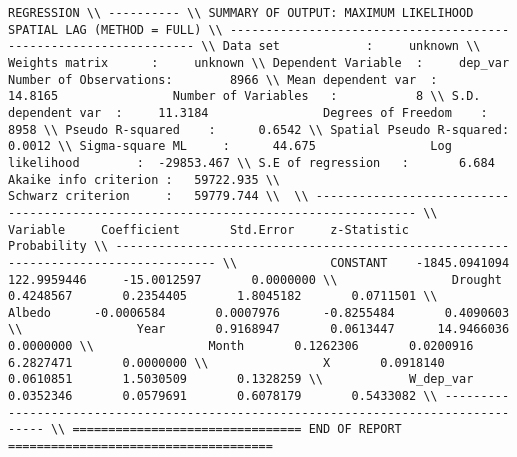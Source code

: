 \documentclass{article}
\begin{document}
 
\begin{verbatim} 
REGRESSION \\ ---------- \\ SUMMARY OF OUTPUT: MAXIMUM LIKELIHOOD SPATIAL LAG (METHOD = FULL) \\ ----------------------------------------------------------------- \\ Data set            :     unknown \\ Weights matrix      :     unknown \\ Dependent Variable  :     dep_var                Number of Observations:        8966 \\ Mean dependent var  :     14.8165                Number of Variables   :           8 \\ S.D. dependent var  :     11.3184                Degrees of Freedom    :        8958 \\ Pseudo R-squared    :      0.6542 \\ Spatial Pseudo R-squared:  0.0012 \\ Sigma-square ML     :      44.675                Log likelihood        :  -29853.467 \\ S.E of regression   :       6.684                Akaike info criterion :   59722.935 \\                                                  Schwarz criterion     :   59779.744 \\  \\ ------------------------------------------------------------------------------------ \\             Variable     Coefficient       Std.Error     z-Statistic     Probability \\ ------------------------------------------------------------------------------------ \\             CONSTANT    -1845.0941094     122.9959446     -15.0012597       0.0000000 \\                Drought       0.4248567       0.2354405       1.8045182       0.0711501 \\                Albedo      -0.0006584       0.0007976      -0.8255484       0.4090603 \\                Year       0.9168947       0.0613447      14.9466036       0.0000000 \\                Month       0.1262306       0.0200916       6.2827471       0.0000000 \\                X       0.0918140       0.0610851       1.5030509       0.1328259 \\            W_dep_var       0.0352346       0.0579691       0.6078179       0.5433082 \\ ------------------------------------------------------------------------------------ \\ ================================ END OF REPORT =====================================
\end{verbatim} 
\end{document}
